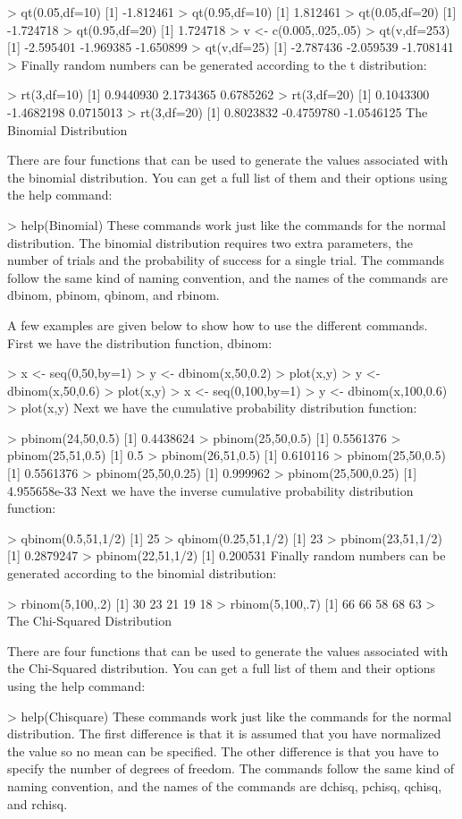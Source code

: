 \documentclass[a4paper,12pt]{article}
\begin{document}
> qt(0.05,df=10)
[1] -1.812461
> qt(0.95,df=10)
[1] 1.812461
> qt(0.05,df=20)
[1] -1.724718
> qt(0.95,df=20)
[1] 1.724718
> v <- c(0.005,.025,.05)
> qt(v,df=253)
[1] -2.595401 -1.969385 -1.650899
> qt(v,df=25)
[1] -2.787436 -2.059539 -1.708141
> 
Finally random numbers can be generated according to the t distribution:

> rt(3,df=10)
[1] 0.9440930 2.1734365 0.6785262
> rt(3,df=20)
[1]  0.1043300 -1.4682198  0.0715013
> rt(3,df=20)
[1]  0.8023832 -0.4759780 -1.0546125
The Binomial Distribution

There are four functions that can be used to generate the values associated with the binomial distribution. You can get a full list of them and their options using the help command:

> help(Binomial)
These commands work just like the commands for the normal distribution. The binomial distribution requires two extra parameters, the number of trials and the probability of success for a single trial. The commands follow the same kind of naming convention, and the names of the commands are dbinom, pbinom, qbinom, and rbinom.

A few examples are given below to show how to use the different commands. First we have the distribution function, dbinom:

> x <- seq(0,50,by=1)
> y <- dbinom(x,50,0.2)
> plot(x,y)
> y <- dbinom(x,50,0.6)
> plot(x,y)
> x <- seq(0,100,by=1)
> y <- dbinom(x,100,0.6)
> plot(x,y)
Next we have the cumulative probability distribution function:

> pbinom(24,50,0.5)
[1] 0.4438624
> pbinom(25,50,0.5)
[1] 0.5561376
> pbinom(25,51,0.5)
[1] 0.5
> pbinom(26,51,0.5)
[1] 0.610116
> pbinom(25,50,0.5)
[1] 0.5561376
> pbinom(25,50,0.25)
[1] 0.999962
> pbinom(25,500,0.25)
[1] 4.955658e-33
Next we have the inverse cumulative probability distribution function:

> qbinom(0.5,51,1/2)
[1] 25
> qbinom(0.25,51,1/2)
[1] 23
> pbinom(23,51,1/2)
[1] 0.2879247
> pbinom(22,51,1/2)
[1] 0.200531
Finally random numbers can be generated according to the binomial distribution:

> rbinom(5,100,.2) 
[1] 30 23 21 19 18
> rbinom(5,100,.7)
[1] 66 66 58 68 63
> 
The Chi-Squared Distribution

There are four functions that can be used to generate the values associated with the Chi-Squared distribution. You can get a full list of them and their options using the help command:

> help(Chisquare)
These commands work just like the commands for the normal distribution. The first difference is that it is assumed that you have normalized the value so no mean can be specified. The other difference is that you have to specify the number of degrees of freedom. The commands follow the same kind of naming convention, and the names of the commands are dchisq, pchisq, qchisq, and rchisq.
\end{document}
